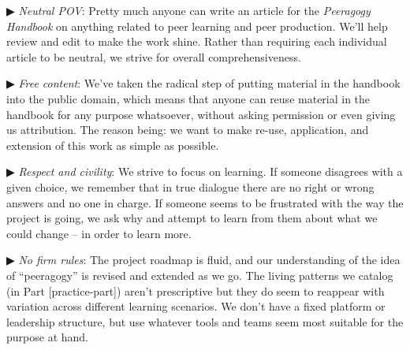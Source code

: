 ▶ \emph{Neutral POV}: Pretty much anyone can write an article for the
\emph{Peeragogy Handbook} on anything related to peer learning and peer
production. We'll help review and edit to make the work shine. Rather
than requiring each individual article to be neutral, we strive for
overall comprehensiveness.

▶ \emph{Free content}: We've taken the radical step of putting material
in the handbook into the public domain, which means that anyone can
reuse material in the handbook for any purpose whatsoever, without
asking permission or even giving us attribution. The reason being: we
want to make re-use, application, and extension of this work as simple
as possible.

▶ \emph{Respect and civility}: We strive to focus on learning. If
someone disagrees with a given choice, we remember that in true dialogue
there are no right or wrong answers and no one in charge. If someone
seems to be frustrated with the way the project is going, we ask why and
attempt to learn from them about what we could change -- in order to
learn more.

▶ \emph{No firm rules}: The project roadmap is fluid, and our
understanding of the idea of ``peeragogy'' is revised and extended as we
go. The living patterns we catalog (in Part {[}practice-part{]}) aren't
prescriptive but they do seem to reappear with variation across
different learning scenarios. We don't have a fixed platform or
leadership structure, but use whatever tools and teams seem most
suitable for the purpose at hand.
